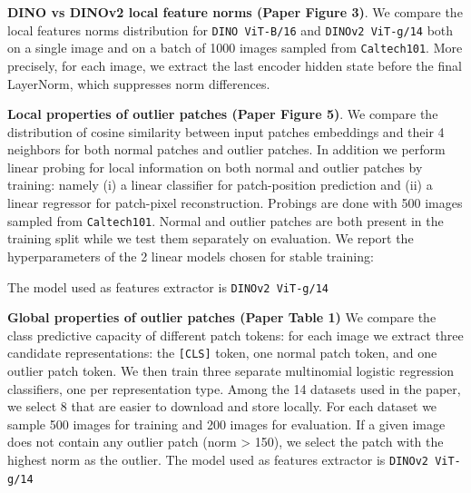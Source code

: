 \textbf{DINO vs DINOv2 local feature norms (Paper Figure 3)}. We compare the local features norms distribution for \texttt{DINO ViT-B/16} and \texttt{DINOv2 ViT-g/14} both on a single image and on a batch of 1000 images sampled from \texttt{Caltech101}. More precisely, for each image, we extract the last encoder hidden state before the final LayerNorm, which suppresses norm differences. 

\textbf{Local properties of outlier patches (Paper Figure 5)}. We compare the distribution of cosine similarity between input patches embeddings and their 4 neighbors for both normal patches and outlier patches. In addition we perform linear probing for local information on both normal and outlier patches by training:
namely (i) a linear classifier for patch-position prediction and (ii) a linear regressor for patch-pixel reconstruction.
Probings are done with 500 images sampled from \texttt{Caltech101}. Normal and outlier patches are both present in the training split while we test them separately on evaluation. We report the hyperparameters of the 2 linear models chosen for stable training: 
\begin{table}[h]
    \centering
    \label{tab:figure5b-hparams}
\end{table}

The model used as features extractor is \texttt{DINOv2 ViT-g/14}

\textbf{Global properties of outlier patches (Paper Table 1)}
We compare the class predictive capacity of different patch tokens: for each image we extract three candidate representations: the \texttt{[CLS]} token, one normal patch token, and one outlier patch token. We then train three separate multinomial logistic regression classifiers, one per representation type. Among the 14 datasets used in the paper, we select 8 that are easier to download and store locally. For each dataset we sample 500 images for training and 200 images for evaluation. If a given image does not contain any outlier patch (norm > 150), we select the patch with the highest norm as the outlier. The model used as features extractor is \texttt{DINOv2 ViT-g/14}



